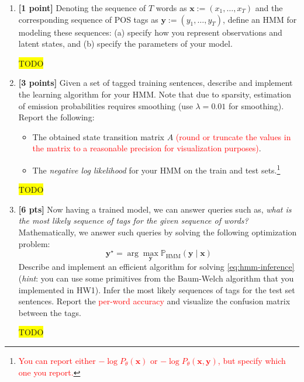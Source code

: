 \documentclass[10pt]{article}
\newcommand{\hilight}[1]{\colorbox{yellow}{#1}}
\begin{document}
\begin{enumerate}
    \item \textbf{[1 point]} Denoting the sequence of $T$ words as $\mathbf{x} := (x_1, \dots, x_T)$ and the corresponding sequence of POS tags as $\mathbf{y} := (y_1, \dots, y_T)$, define an HMM for modeling these sequences: (a) specify how you represent observations and latent states, and (b) specify the parameters of your model.

\begin{solution}
\hilight{TODO}
\end{solution}

    \item \textbf{[3 points]} Given a set of tagged training sentences, describe and implement the learning algorithm for your HMM.
    Note that due to sparsity, estimation of emission probabilities requires smoothing (use $\lambda = 0.01$ for smoothing).
    Report the following:
    \begin{itemize}
    \item The obtained state transition matrix $A$ \textcolor{red}{(round or truncate the values in the matrix to a reasonable precision for visualization purposes)}.
    \item The \emph{negative log likelihood} for your HMM on the train and test sets.\footnote{\textcolor{red}{You can report either $-\log P_\theta(\mathbf{x})$ or $-\log P_\theta(\mathbf{x}, \mathbf{y})$, but specify which one you report.}}
    \end{itemize}

\begin{solution}
\hilight{TODO}
\end{solution}

    \item \textbf{[6 pts]} Now having a trained model, we can answer queries such as, \emph{what is the most likely sequence of tags for the given sequence of words?} Mathematically, we answer such queries by solving the following optimization problem:
    \begin{equation}
        \label{eq:hmm-inference}
        \mathbf{y}^\star = \arg\max_{\mathbf{y}} \mathbb{P}_\mathrm{HMM}(\mathbf{y} \mid \mathbf{x})
    \end{equation}
    Describe and implement an efficient algorithm for solving \eqref{eq:hmm-inference} (\emph{hint}: you can use some primitives from the Baum-Welch algorithm that you implemented in HW1).
    Infer the most likely sequences of tags for the test set sentences.
    Report the \textcolor{red}{per-word accuracy} and visualize the confusion matrix between the tags.

\begin{solution}
\hilight{TODO}
\end{solution}

\end{enumerate}
\end{document}
